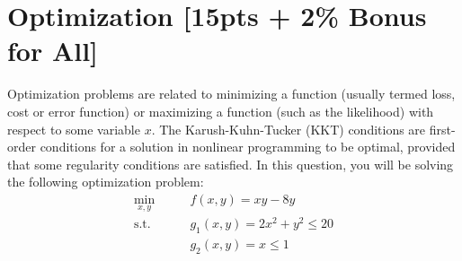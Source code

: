 \documentclass{article}
\begin{document}
\newpage
\section{Optimization [15pts + 2\% Bonus for All]}
Optimization problems are related to minimizing a function (usually termed loss, cost or error function) or maximizing a function (such as the likelihood) with respect to some variable $x$. The Karush-Kuhn-Tucker (KKT) conditions are first-order conditions for a solution in nonlinear programming to be optimal, provided that some regularity conditions are satisfied. In this question, you will be solving the following optimization problem:
\begin{align*}
    \min_{x,y} \qquad & f(x,y) = xy-8y \\
    \text{s.t.} \qquad & g_{1}(x,y) = 2x^{2}+y^{2}\leq 20 \\
    & g_{2}(x,y) =  x \leq 1
\end{align*}
\end{document}
